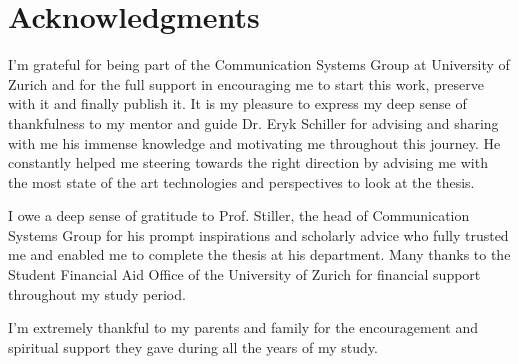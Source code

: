 \chapter*{Acknowledgments}



I'm grateful for being part of the Communication Systems Group at University of Zurich and for the full support in encouraging me to start this work, preserve with it and finally publish it. 
It is my pleasure to express my deep sense of thankfulness to my mentor and guide Dr. Eryk Schiller for advising and sharing with me his immense knowledge and motivating me throughout this journey. He constantly helped me steering towards the right direction by advising me with the most state of the art technologies and perspectives to look at the thesis.

I owe a deep sense of gratitude to Prof. Stiller, the head of Communication Systems Group for his prompt inspirations and scholarly advice who fully trusted me and enabled me to complete the thesis at his department. 
Many thanks to the Student Financial Aid Office of the University of Zurich for financial support throughout my study period. 

I'm extremely thankful to my parents and family for the encouragement and spiritual support they gave during all the years of my study. 





